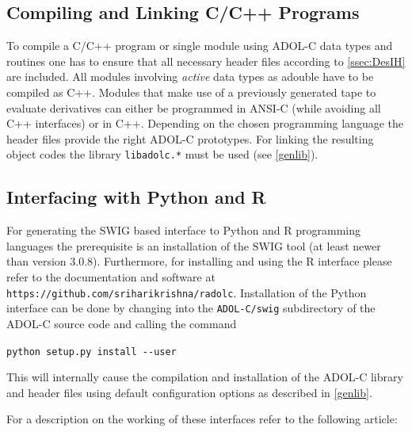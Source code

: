 \documentclass[11pt,twoside]{article}
\begin{document}
\subsection{Compiling and Linking C/C++ Programs}
%
To compile a C/C++ program or single module using ADOL-C
data types and routines one has to ensure that all necessary
header files according to \autoref{ssec:DesIH} are 
included. All modules involving {\em active} data types as
{\sf adouble}
have to be compiled as C++. Modules that make use of a previously
generated tape to evaluate derivatives can either be programmed in ANSI-C
(while avoiding all C++ interfaces) or in C++. Depending
on the chosen programming language the header files provide
the right ADOL-C prototypes. 
For linking the resulting object codes the library \verb=libadolc.*= 
must be used (see \autoref{genlib}). 
\subsection{Interfacing with Python and R}
For generating the SWIG based interface to Python and R programming
languages the prerequisite is an installation of the SWIG tool (at
least newer than version 3.0.8). Furthermore, for installing and using
the R interface please refer to the documentation and software at
\verb=https://github.com/sriharikrishna/radolc=.
Installation of the Python interface can be done by changing into the
\verb=ADOL-C/swig= subdirectory of the ADOL-C source code and calling
the command
\begin{center}
\verb=python setup.py install --user=
\end{center}
This will internally cause the compilation and installation of the
ADOL-C library and header files using default configuration options as
described in \autoref{genlib}.

For a description on the working of these interfaces refer to the
following article:


%
\end{document}
